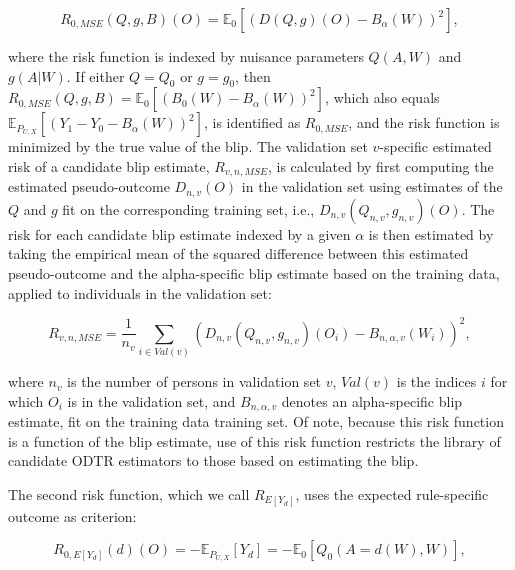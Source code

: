 \documentclass[a4paper,12pt]{article}
\begin{document}
\begin{enumerate}
\[R_{0,MSE}(Q,g,B)(O) = \mathbb{E}_0[(D(Q,g)(O)-B_{\alpha}(W))^2],\] 

where the risk function is indexed by nuisance parameters $Q(A,W)$ and $g(A|W)$. If either $Q=Q_0$ or $g=g_0$, then $R_{0,MSE}(Q,g,B) = \mathbb{E}_0\left[\left(B_0(W)-B_\alpha(W)\right)^2\right]$, which also equals $\mathbb{E}_{P_{U,X}}\left[\left(Y_1-Y_0-B_\alpha(W)\right)^2\right]$,  is identified as $R_{0,MSE}$, and the risk function is minimized by the true value of the blip. The validation set $v$-specific estimated risk of a candidate blip estimate, $R_{v,n,MSE}$, is calculated by first computing the estimated pseudo-outcome $D_{n,v}(O)$ in the validation set using estimates of the $Q$ and $g$ fit on the corresponding training set, i.e., $D_{n,v}(Q_{n,v},g_{n,v})(O)$. The risk for each candidate blip estimate indexed by a given $\alpha$ is then estimated by taking the empirical mean of the squared difference between this estimated pseudo-outcome and the alpha-specific blip estimate based on the training data, applied to individuals in the validation set:

\[R_{v,n,MSE}=\frac{1}{n_v}\sum_{i \in Val(v)} \left( D_{n,v}(Q_{n,v},g_{n,v})(O_i) - B_{n,\alpha,v}(W_i) \right)^2,\]

where $n_v$ is the number of persons in validation set $v$, $Val(v)$ is the indices $i$ for which $O_i$ is in the validation set, and  $B_{n,\alpha,v}$ denotes an alpha-specific blip estimate, fit on the training data training set. Of note, because this risk function is a function of the blip estimate, use of this risk function restricts the library of candidate ODTR estimators to those based on estimating the blip. 

The second risk function, which we call $R_{E[Y_d]}$, uses the expected rule-specific outcome as criterion:

\[R_{0,E[Y_d]}(d)(O)=-\mathbb{E}_{P_{U,X}}[Y_d] = -\mathbb{E}_0[Q_0(A=d(W),W)],\]


\end{enumerate}
\end{document}
